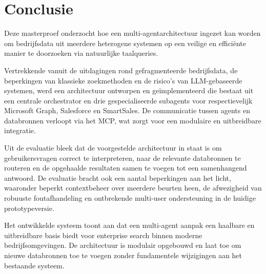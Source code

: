 \chapter*{Conclusie}


Deze masterproef onderzocht hoe een multi-agentarchitectuur ingezet kan worden om bedrijfsdata uit meerdere heterogene systemen op een veilige en efficiënte manier te doorzoeken via natuurlijke taalqueries.

Vertrekkende vanuit de uitdagingen rond gefragmenteerde bedrijfsdata, de beperkingen van klassieke zoekmethoden en de risico's van \gls{LLM}-gebaseerde systemen, werd een architectuur ontworpen en geïmplementeerd die bestaat uit een centrale orchestrator en drie gespecialiseerde subagents voor respectievelijk Microsoft Graph, Salesforce en SmartSales. De communicatie tussen agents en databronnen verloopt via het \gls{MCP}, wat zorgt voor een modulaire en uitbreidbare integratie.

Uit de evaluatie bleek dat de voorgestelde architectuur in staat is om gebruikersvragen correct te interpreteren, naar de relevante databronnen te routeren en de opgehaalde resultaten samen te voegen tot een samenhangend antwoord. De evaluatie bracht ook een aantal beperkingen aan het licht, waaronder beperkt contextbeheer over meerdere beurten heen, de afwezigheid van robuuste foutafhandeling en ontbrekende multi-user ondersteuning in de huidige prototypeversie.

Het ontwikkelde systeem toont aan dat een multi-agent aanpak een haalbare en uitbreidbare basis biedt voor enterprise search binnen moderne bedrijfsomgevingen. De architectuur is modulair opgebouwd en laat toe om nieuwe databronnen toe te voegen zonder fundamentele wijzigingen aan het bestaande systeem.

